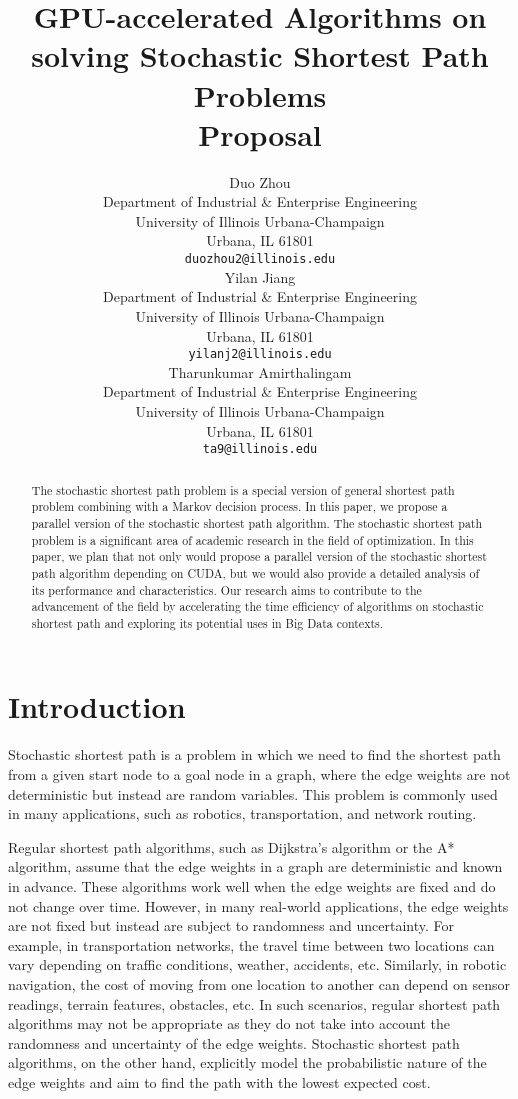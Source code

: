 \documentclass{article}
\title{GPU-accelerated Algorithms on solving Stochastic Shortest Path Problems\\ Proposal}
\author{
  Duo Zhou\\
  Department of Industrial \& Enterprise Engineering\\
  University of Illinois Urbana-Champaign\\
  Urbana, IL 61801 \\
  \texttt{duozhou2@illinois.edu} \\
  \And
  Yilan Jiang \\
  Department of Industrial \& Enterprise Engineering\\
  University of Illinois Urbana-Champaign\\
  Urbana, IL 61801 \\
  \texttt{yilanj2@illinois.edu} \\
  \And
  Tharunkumar Amirthalingam\\
  Department of Industrial \& Enterprise Engineering\\
  University of Illinois Urbana-Champaign\\
  Urbana, IL 61801 \\
  \texttt{ta9@illinois.edu} \\
}
\begin{document}
\maketitle

\begin{abstract}
  The stochastic shortest path problem is a special version of general shortest path problem combining with 
  a Markov decision process. In this paper, we propose a parallel version of the stochastic shortest path algorithm. 
  The stochastic shortest path problem is a significant area of academic research in the field of optimization. 
  In this paper, we plan that not only would propose a parallel version of the stochastic shortest path algorithm 
  depending on CUDA, but we would also provide a detailed analysis of its performance and characteristics. 
  Our research aims to contribute to the advancement of the field by accelerating the time efficiency of algorithms 
  on stochastic shortest path and exploring its potential uses in Big Data contexts. 
\end{abstract}

\section{Introduction}

Stochastic shortest path is a problem in which we need to find the shortest path from
a given start node to a goal node in a graph, where the edge weights are not deterministic 
but instead are random variables. This problem is commonly used in many applications, 
such as robotics, transportation, and network routing.

Regular shortest path algorithms, such as Dijkstra's algorithm or the A* algorithm, 
assume that the edge weights in a graph are deterministic and known in advance. 
These algorithms work well when the edge weights are fixed and do not change over time. 
However, in many real-world applications, the edge weights are not fixed but instead are 
subject to randomness and uncertainty. For example, in transportation networks, the travel 
time between two locations can vary depending on traffic conditions, weather, accidents, etc. 
Similarly, in robotic navigation, the cost of moving from one location to another can depend 
on sensor readings, terrain features, obstacles, etc. In such scenarios, regular shortest path 
algorithms may not be appropriate as they do not take into account the randomness and uncertainty 
of the edge weights. Stochastic shortest path algorithms, on the other hand, explicitly model the 
probabilistic nature of the edge weights and aim to find the path with the lowest expected cost.
\end{document}
